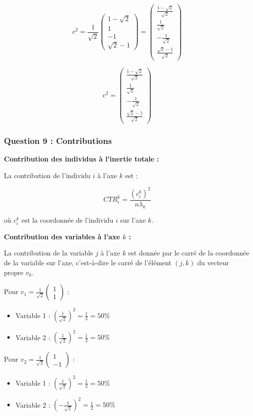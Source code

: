 \documentclass[11pt,a4paper]{article}
\begin{document}
$$c^2 = \frac{1}{\sqrt{2}} \begin{pmatrix}
1 - \sqrt{2} \\
1 \\
-1 \\
\sqrt{2} - 1
\end{pmatrix} = \begin{pmatrix}
\frac{1 - \sqrt{2}}{\sqrt{2}} \\
\frac{1}{\sqrt{2}} \\
-\frac{1}{\sqrt{2}} \\
\frac{\sqrt{2} - 1}{\sqrt{2}}
\end{pmatrix}$$

$$\boxed{c^2 = \begin{pmatrix}
\frac{1 - \sqrt{2}}{\sqrt{2}} \\
\frac{1}{\sqrt{2}} \\
-\frac{1}{\sqrt{2}} \\
\frac{\sqrt{2} - 1}{\sqrt{2}}
\end{pmatrix}}$$

\subsubsection{Question 9 : Contributions}

\textbf{Contribution des individus à l'inertie totale :}

La contribution de l'individu $i$ à l'axe $k$ est :

$$CTR_i^k = \frac{(c_i^k)^2}{n \lambda_k}$$

où $c_i^k$ est la coordonnée de l'individu $i$ sur l'axe $k$.

\textbf{Contribution des variables à l'axe $k$ :}

La contribution de la variable $j$ à l'axe $k$ est donnée par le carré de la coordonnée de la variable sur l'axe, c'est-à-dire le carré de l'élément $(j,k)$ du vecteur propre $v_k$.

Pour $v_1 = \frac{1}{\sqrt{2}} \begin{pmatrix} 1 \\ 1 \end{pmatrix}$ :
\begin{itemize}
    \item Variable 1 : $\left(\frac{1}{\sqrt{2}}\right)^2 = \frac{1}{2} = 50\%$
    \item Variable 2 : $\left(\frac{1}{\sqrt{2}}\right)^2 = \frac{1}{2} = 50\%$
\end{itemize}

Pour $v_2 = \frac{1}{\sqrt{2}} \begin{pmatrix} 1 \\ -1 \end{pmatrix}$ :
\begin{itemize}
    \item Variable 1 : $\left(\frac{1}{\sqrt{2}}\right)^2 = \frac{1}{2} = 50\%$
    \item Variable 2 : $\left(-\frac{1}{\sqrt{2}}\right)^2 = \frac{1}{2} = 50\%$
\end{itemize}
\end{document}
